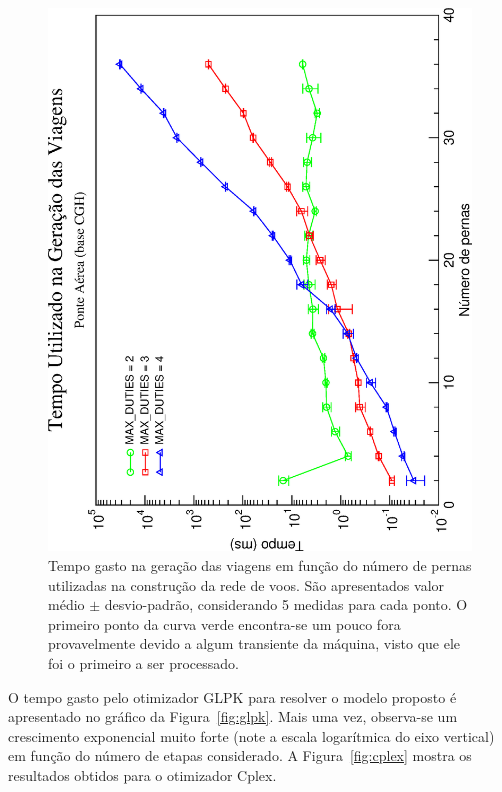 \begin{figure}[htb]
	\begin{center}
		\includegraphics[scale=0.45,angle=-90]{fig/generation_time.eps}
		\caption{Tempo gasto na geração das viagens em função do número de pernas utilizadas na 
		construção da rede de voos. São apresentados valor médio $\pm$ desvio-padrão, considerando 5 
		medidas para cada ponto. O primeiro ponto da curva verde encontra-se um pouco fora provavelmente
		devido a algum transiente da máquina, visto que ele foi o primeiro a ser processado.}
		\label{fig:generation}
	\end{center}
\end{figure}

O tempo gasto pelo otimizador GLPK para resolver o modelo proposto é apresentado no gráfico da 
Figura~\ref{fig:glpk}. Mais uma vez, observa-se um crescimento exponencial muito forte (note a 
escala logarítmica do eixo vertical) em função do número de etapas considerado. A 
Figura~\ref{fig:cplex} mostra os resultados obtidos para o otimizador Cplex. 

